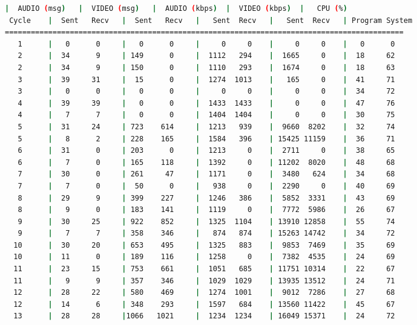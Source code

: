 \begin{adjustbox}{max width=\textwidth}
\begin{lstlisting}[language=bash,basicstyle=\ttfamily\scriptsize]
          |  AUDIO (msg)   |  VIDEO (msg)   |  AUDIO (kbps)  |  VIDEO (kbps)  |   CPU (%)
 Cycle    |  Sent   Recv   |  Sent   Recv   |   Sent  Recv   |   Sent  Recv   | Program System
============================================================================================
   1      |   0      0     |   0      0     |     0     0    |     0     0    |   0      0
   2      |  34      9     | 149      0     |  1112   294    |  1665     0    |  18     62
   2      |  34      9     | 150      0     |  1110   293    |  1674     0    |  18     63
   3      |  39     31     |  15      0     |  1274  1013    |   165     0    |  41     71
   3      |   0      0     |   0      0     |     0     0    |     0     0    |  34     72
   4      |  39     39     |   0      0     |  1433  1433    |     0     0    |  47     76
   4      |   7      7     |   0      0     |  1404  1404    |     0     0    |  30     75
   5      |  31     24     | 723    614     |  1213   939    |  9660  8202    |  32     74
   5      |   8      2     | 228    165     |  1584   396    | 15425 11159    |  36     71
   6      |  31      0     | 203      0     |  1213     0    |  2711     0    |  38     65
   6      |   7      0     | 165    118     |  1392     0    | 11202  8020    |  48     68
   7      |  30      0     | 261     47     |  1171     0    |  3480   624    |  34     68
   7      |   7      0     |  50      0     |   938     0    |  2290     0    |  40     69
   8      |  29      9     | 399    227     |  1246   386    |  5852  3331    |  43     69
   8      |   9      0     | 183    141     |  1119     0    |  7772  5986    |  26     67
   9      |  30     25     | 922    852     |  1325  1104    | 13910 12858    |  55     74
   9      |   7      7     | 358    346     |   874   874    | 15263 14742    |  34     72
  10      |  30     20     | 653    495     |  1325   883    |  9853  7469    |  35     69
  10      |  11      0     | 189    116     |  1258     0    |  7382  4535    |  24     69
  11      |  23     15     | 753    661     |  1051   685    | 11751 10314    |  22     67
  11      |   9      9     | 357    346     |  1029  1029    | 13935 13512    |  24     71
  12      |  28     22     | 580    469     |  1274  1001    |  9012  7286    |  27     68
  12      |  14      6     | 348    293     |  1597   684    | 13560 11422    |  45     67
  13      |  28     28     |1066   1021     |  1234  1234    | 16049 15371    |  24     72

\end{lstlisting}
\end{adjustbox}
